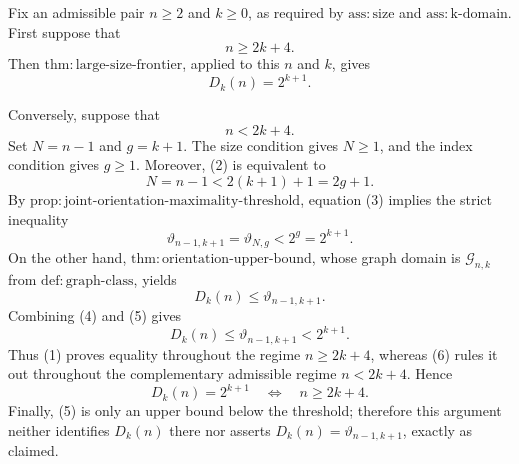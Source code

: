 Fix an admissible pair \(n\geq 2\) and \(k\geq 0\), as required by \(\mathrm{ass:size}\) and \(\mathrm{ass:k\mbox{-}domain}\).  First suppose that
\[
n\geq 2k+4.
\]
Then \(\mathrm{thm:large\mbox{-}size\mbox{-}frontier}\), applied to this \(n\) and \(k\), gives
\[
D_k(n)=2^{k+1}.
\tag{1}
\]

Conversely, suppose that
\[
n<2k+4.
\tag{2}
\]
Set \(N=n-1\) and \(g=k+1\).  The size condition gives \(N\geq1\), and the index condition gives \(g\geq1\).  Moreover, (2) is equivalent to
\[
N=n-1<2(k+1)+1=2g+1.
\tag{3}
\]
By \(\mathrm{prop:joint\mbox{-}orientation\mbox{-}maximality\mbox{-}threshold}\), equation (3) implies the strict inequality
\[
\vartheta_{n-1,k+1}=\vartheta_{N,g}<2^g=2^{k+1}.
\tag{4}
\]
On the other hand, \(\mathrm{thm:orientation\mbox{-}upper\mbox{-}bound}\), whose graph domain is \(\mathcal G_{n,k}\) from \(\mathrm{def:graph\mbox{-}class}\), yields
\[
D_k(n)\leq \vartheta_{n-1,k+1}.
\tag{5}
\]
Combining (4) and (5) gives
\[
D_k(n)\leq\vartheta_{n-1,k+1}<2^{k+1}.
\tag{6}
\]
Thus (1) proves equality throughout the regime \(n\geq2k+4\), whereas (6) rules it out throughout the complementary admissible regime \(n<2k+4\).  Hence
\[
D_k(n)=2^{k+1}
\quad\Longleftrightarrow\quad
n\geq2k+4.
\]
Finally, (5) is only an upper bound below the threshold; therefore this argument neither identifies \(D_k(n)\) there nor asserts \(D_k(n)=\vartheta_{n-1,k+1}\), exactly as claimed.
